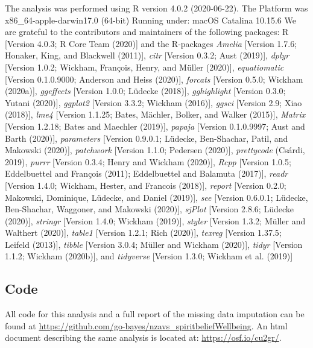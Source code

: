 \documentclass[
  english,
  man,floatsintext]{apa6}
\begin{document}
The analysis was performed using R version 4.0.2 (2020-06-22). The Platform was x86\_64-apple-darwin17.0 (64-bit) Running under: macOS Catalina 10.15.6 We are grateful to the contributors and maintainers of the following packages: R {[}Version 4.0.3; R Core Team (2020){]} and the R-packages \emph{Amelia} {[}Version 1.7.6; Honaker, King, and Blackwell (2011){]}, \emph{citr} {[}Version 0.3.2; Aust (2019){]}, \emph{dplyr} {[}Version 1.0.2; Wickham, François, Henry, and Müller (2020){]}, \emph{equatiomatic} {[}Version 0.1.0.9000; Anderson and Heiss (2020){]}, \emph{forcats} {[}Version 0.5.0; Wickham (2020a){]}, \emph{ggeffects} {[}Version 1.0.0; Lüdecke (2018){]}, \emph{gghighlight} {[}Version 0.3.0; Yutani (2020){]}, \emph{ggplot2} {[}Version 3.3.2; Wickham (2016){]}, \emph{ggsci} {[}Version 2.9; Xiao (2018){]}, \emph{lme4} {[}Version 1.1.25; Bates, Mächler, Bolker, and Walker (2015){]}, \emph{Matrix} {[}Version 1.2.18; Bates and Maechler (2019){]}, \emph{papaja} {[}Version 0.1.0.9997; Aust and Barth (2020){]}, \emph{parameters} {[}Version 0.9.0.1; Lüdecke, Ben-Shachar, Patil, and Makowski (2020){]}, \emph{patchwork} {[}Version 1.1.0; Pedersen (2020){]}, \emph{prettycode} (Csárdi, 2019), \emph{purrr} {[}Version 0.3.4; Henry and Wickham (2020){]}, \emph{Rcpp} {[}Version 1.0.5; Eddelbuettel and François (2011); Eddelbuettel and Balamuta (2017){]}, \emph{readr} {[}Version 1.4.0; Wickham, Hester, and Francois (2018){]}, \emph{report} {[}Version 0.2.0; Makowski, Dominique, Lüdecke, and Daniel (2019){]}, \emph{see} {[}Version 0.6.0.1; Lüdecke, Ben-Shachar, Waggoner, and Makowski (2020){]}, \emph{sjPlot} {[}Version 2.8.6; Lüdecke (2020){]}, \emph{stringr} {[}Version 1.4.0; Wickham (2019){]}, \emph{styler} {[}Version 1.3.2; Müller and Walthert (2020){]}, \emph{table1} {[}Version 1.2.1; Rich (2020){]}, \emph{texreg} {[}Version 1.37.5; Leifeld (2013){]}, \emph{tibble} {[}Version 3.0.4; Müller and Wickham (2020){]}, \emph{tidyr} {[}Version 1.1.2; Wickham (2020b){]}, and \emph{tidyverse} {[}Version 1.3.0; Wickham et al. (2019){]}

\hypertarget{code}{%
\subsection{Code}\label{code}}

All code for this analysis and a full report of the missing data imputation can be found at \url{https://github.com/go-bayes/nzavs_spiritbeliefWellbeing}. An html document describing the same analysis is located at: \url{https://osf.io/cu2gr/}.
\end{document}
